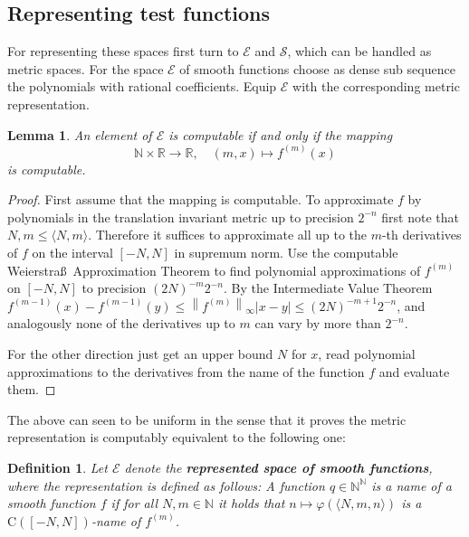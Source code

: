 \documentclass{eptcs-modified}
\newtheorem{definition}[theorem]{Definition}
\newtheorem{lemma}[theorem]{Lemma}
\newcommand{\Baire}{{\mathbb{N}^\mathbb{N}}}
\newcommand{\demph}{\textbf}
\newcommand{\C}{\textrm{C}}
\newcommand{\NN}{\mathbb{N}}
\newcommand{\RR}{\mathbb{R}}
\newcommand{\EE}{\mathcal E}
\newcommand{\SF}{\mathcal S}
\newcommand{\abs}[1]{\left|#1\right|}
\newcommand{\norm}[1]{\left\|#1\right\|}
\begin{document}
		\subsection{Representing test functions}
			For representing these spaces first turn to $\EE$ and $\SF$, which can be handled as metric spaces.
			For the space $\EE$ of smooth functions choose as dense sub sequence the polynomials with rational coefficients.
			Equip $\EE$ with the corresponding metric representation.
			\begin{lemma}\label{resu:evaluation of the derivatives}
				An element of $\EE$ is computable if and only if the mapping
				\[ \NN\times \RR \to \RR, \quad(m,x) \mapsto f^{(m)}(x) \]
				is computable.
			\end{lemma}
			\begin{proof}
				First assume that the mapping is computable.
				To approximate $f$ by polynomials in the translation invariant metric up to precision $2^{-n}$ first note that $N,m\leq\langle N,m\rangle$.
				Therefore it suffices to approximate all up to the $m$-th derivatives of $f$ on the interval $[-N,N]$ in supremum norm.
				Use the computable Weierstra\ss\ Approximation Theorem to find polynomial approximations of $f^{(m)}$ on $[-N,N]$ to precision $(2N)^{-m}2^{-n}$.
				By the Intermediate Value Theorem $f^{(m-1)}(x) -f^{(m-1)}(y) \leq \norm {f^{(m)}}_\infty \abs{x-y}\leq (2N)^{-m+1}2^{-n}$, and analogously none of the derivatives up to $m$ can vary by more than $2^{-n}$.

				For the other direction just get an upper bound $N$ for $x$, read polynomial approximations to the derivatives from the name of the function $f$ and evaluate them.
			\end{proof}
			The above can seen to be uniform in the sense that it proves the metric representation is computably equivalent to the following one:
			\begin{definition}\label{def:smooth functions reprsentation}
				Let $\EE$ denote the \demph{represented space of smooth functions}, where the representation is defined as follows: A function $q\in\Baire$ is a name of a smooth function $f$ if for all $N,m\in\NN$ it holds that $n\mapsto \varphi(\langle N,m ,n\rangle)$ is a $\C([-N,N])$-name of $f^{(m)}$.
			\end{definition}
\end{document}
